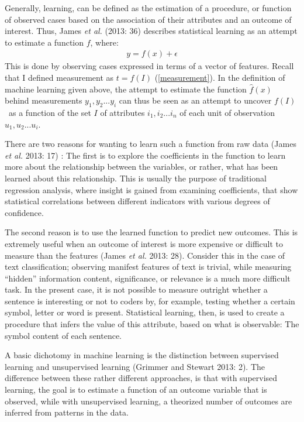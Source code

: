 \documentclass[12pt,twoside]{reedthesis}
\begin{document}
Generally, learning, can be defined as the estimation of a procedure, or
function of observed cases based on the association of their attributes
and an outcome of interest. Thus, James \emph{et al.} (2013: 36)
describes statistical learning as an attempt to estimate a function
\(f\), where:
\begin{align}
y = f(x) + \epsilon \label{ml1}
\end{align}
This is done by observing cases expressed in terms of a vector of
features. Recall that I defined measurement as \(t = f(I)\)
(\ref{measurement}). In the definition of machine learning given above,
the attempt to estimate the function \(\hat{f}(x)\) behind measurements
\(y_1,y_2...y_i\) can thus be seen as an attempt to uncover \(f(I)\)~as
a function of the set \(I\) of attributes \(i_1,i_2...i_n\) of each unit
of observation \(u_1,u_2...u_i\).

There are two reasons for wanting to learn such a function from raw data
(James \emph{et al.} 2013: 17) : The first is to explore the
coefficients in the function to learn more about the relationship
between the variables, or rather, what has been learned about this
relationship. This is usually the purpose of traditional regression
analysis, where insight is gained from examining coefficients, that show
statistical correlations between different indicators with various
degrees of confidence.

The second reason is to use the learned function to predict new
outcomes. This is extremely useful when an outcome of interest is more
expensive or difficult to measure than the features (James \emph{et al.}
2013: 28). Consider this in the case of text classification; observing
manifest features of text is trivial, while measuring ``hidden''
information content, significance, or relevance is a much more difficult
task. In the present case, it is not possible to measure outright
whether a sentence is interesting or not to coders by, for example,
testing whether a certain symbol, letter or word is present. Statistical
learning, then, is used to create a procedure that infers the value of
this attribute, based on what is observable: The symbol content of each
sentence.

A basic dichotomy in machine learning is the distinction between
supervised learning and unsupervised learning (Grimmer and Stewart 2013:
2). The difference between these rather different approaches, is that
with supervised learning, the goal is to estimate a function of an
outcome variable that is observed, while with unsupervised learning, a
theorized number of outcomes are inferred from patterns in the data.
\end{document}
